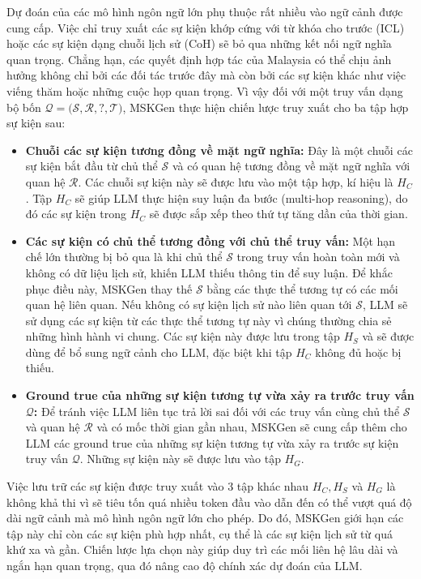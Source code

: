 Dự đoán của các mô hình ngôn ngữ lớn phụ thuộc rất nhiều vào ngữ cảnh được cung cấp. Việc chỉ truy xuất các sự kiện khớp cứng với từ khóa cho trước (ICL) hoặc các sự kiện dạng chuỗi lịch sử (CoH) sẽ bỏ qua những kết nối ngữ nghĩa quan trọng. Chẳng hạn, các quyết định hợp tác của Malaysia có thể chịu ảnh hưởng không chỉ bởi các đối tác trước đây mà còn bởi các sự kiện khác như việc viếng thăm hoặc những cuộc họp quan trọng. Vì vậy đối với một truy vấn dạng bộ bốn $\mathcal{Q = (S, R, ?, T})$, MSKGen thực hiện chiến lược truy xuất cho ba tập hợp sự kiện sau:
\begin{itemize}
    \item \textbf{Chuỗi các sự kiện tương đồng về mặt ngữ nghĩa:} Đây là một chuỗi các sự kiện bắt đầu từ chủ thể $\mathcal{S}$ và có quan hệ tương đồng về mặt ngữ nghĩa với quan hệ $\mathcal{R}$. Các chuỗi sự kiện này sẽ được lưu vào một tập hợp, kí hiệu là $H_C$. Tập $H_C$ sẽ giúp LLM thực hiện suy luận đa bước (multi-hop reasoning), do đó các sự kiện trong $H_C$ sẽ được sắp xếp theo thứ tự tăng dần của thời gian.
    \item \textbf{Các sự kiện có chủ thể tương đồng với chủ thể truy vấn:} Một hạn chế lớn thường bị bỏ qua là khi chủ thể $\mathcal{S}$ trong truy vấn hoàn toàn mới và không có dữ liệu lịch sử, khiến LLM thiếu thông tin để suy luận. Để khắc phục điều này, MSKGen thay thế $\mathcal{S}$ bằng các thực thể tương tự có các mối quan hệ liên quan. Nếu không có sự kiện lịch sử nào liên quan tới $\mathcal{S}$, LLM sẽ sử dụng các sự kiện từ các thực thể tương tự này vì chúng thường chia sẻ những hình hành vi chung. Các sự kiện này được lưu trong tập $H_S$ và sẽ được dùng để bổ sung ngữ cảnh cho LLM, đặc biệt khi tập $H_C$ không đủ hoặc bị thiếu.
    \item \textbf{Ground true của những sự kiện tương tự vừa xảy ra trước truy vấn $\mathcal{Q}$:} Để tránh việc LLM liên tục trả lời sai đối với các truy vấn cùng chủ thể $\mathcal{S}$ và quan hệ $\mathcal{R}$ và có mốc thời gian gần nhau, MSKGen sẽ cung cấp thêm cho LLM các ground true của những sự kiện tương tự vừa xảy ra trước sự kiện truy vấn $\mathcal{Q}$. Những sự kiện này sẽ được lưu vào tập $H_G$.
\end{itemize}

Việc lưu trữ các sự kiện được truy xuất vào 3 tập khác nhau $H_C, H_S$ và $H_G$ là không khả thi vì sẽ tiêu tốn quá nhiều token đầu vào dẫn đến có thể vượt quá độ dài ngữ cảnh mà mô hình ngôn ngữ lớn cho phép. Do đó, MSKGen giới hạn các tập này chỉ còn các sự kiện phù hợp nhất, cụ thể là các sự kiện lịch sử từ quá khứ xa và gần. Chiến lược lựa chọn này giúp duy trì các mối liên hệ lâu dài và ngắn hạn quan trọng, qua đó nâng cao độ chính xác dự đoán của LLM. 

